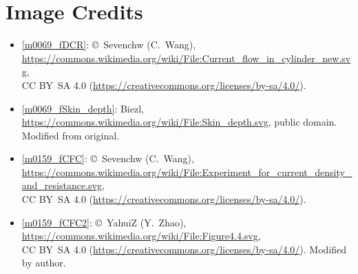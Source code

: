 

\label{m0183_Ch_End_Matter_Current_Flow_Imperfect_Conductor} %

\onecolumn
\section*{Image Credits}

\begin{itemize}

\item[Fig.] \label{m0069_fDCR_Credit}
  \ref{m0069_fDCR}:
  \copyright~Sevenchw (C.\ Wang), 
  \url{https://commons.wikimedia.org/wiki/File:Current_flow_in_cylinder_new.svg},\\ 
  CC BY~SA 4.0 (\url{https://creativecommons.org/licenses/by-sa/4.0/}).

\item[Fig.] \label{m0069_fSkin_depth_credit}
  \ref{m0069_fSkin_depth}:
  Biezl, 
  \url{https://commons.wikimedia.org/wiki/File:Skin_depth.svg}, 
  public domain.
  Modified from original.

\item[Fig.] \label{m0159_fCFC_Credit}
  \ref{m0159_fCFC}:
  \copyright~Sevenchw (C.\ Wang), 
  \url{https://commons.wikimedia.org/wiki/File:Experiment_for_current_density_and_resistance.svg},\\ 
  CC BY~SA 4.0 (\url{https://creativecommons.org/licenses/by-sa/4.0/}).

\item[Fig.] \label{m0159_fCFC2_Credit}
  \ref{m0159_fCFC2}:
  \copyright~YahuiZ (Y.\ Zhao), 
  \url{https://commons.wikimedia.org/wiki/File:Figure4.4.svg},\\ 
  CC BY~SA 4.0 (\url{https://creativecommons.org/licenses/by-sa/4.0/}).
  Modified by author.

\end{itemize}

\twocolumn
